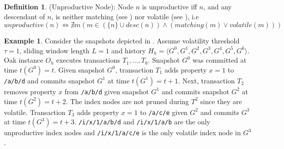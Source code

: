 \documentclass[abstracton,12pt]{scrartcl}
\theoremstyle{definition}
\newtheorem{definition}{Definition}
\newtheorem{example}{Example}
\begin{document}
\begin{definition}
  (Unproductive Node): Node $n$ is unproductive iff $n$, and any descendant of
  $n$, is neither matching (see ) nor volatile (see
  ), i.e
  $$ unproductive(n) \iff \nexists m (m \in (\{n\} \cup desc(n)) \land
  (matching(m) \lor volatile(m)))$$
\end{definition}

\begin{example}
  Consider the snapshots depicted in . Assume volatility
  threshold $\tau = 1$, sliding window length $L = 1$ and history $H_h
  = \langle G^0,G^1,G^2,G^3,G^4,G^5,G^6 \rangle$. Oak instance $O_h$ executes transactions
  $T_1, \dots , T_6$. Snapshot $G^0$ was committed at time $t(G^0) =
  t$. Given snapshot $G^0$, transaction $T_1$ adds property $x=1$ to
  \texttt{/a/b/d} and commits snapshot $G^1$ at time $t(G^1) = t + 1$. Next,
  transaction $T_2$ removes property $x$ from \texttt{/a/b/d} given snapshot
  $G^1$ and commits snapshot $G^2$ at time $t(G^2) = t + 2$. The index nodes are
  not pruned during $T^2$ since they are volatile. Transaction $T_3$ adds
  property $x=1$ to \texttt{/a/c/e} given $G^2$ and commits $G^3$ at time
  $t(G^3) = t+3$. %
  \texttt{/i/x/1/a/b/d} and \texttt{/i/x/1/a/b} are
  the only unproductive index nodes and \texttt{/i/x/1/a/c/e} is the only
  volatile index node in $G^3$. %
\end{example}
\end{document}
